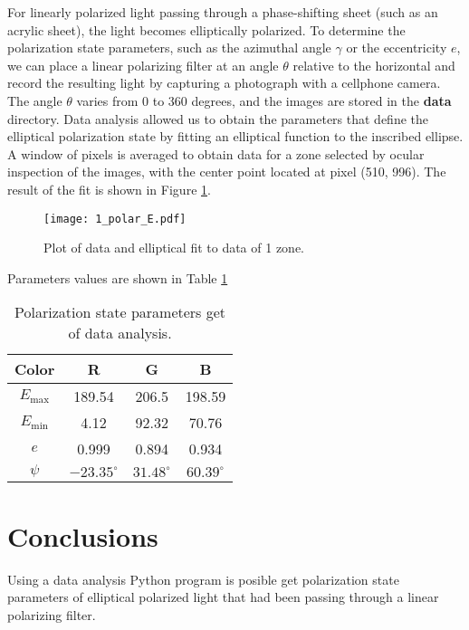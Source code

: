 \documentclass{article}
\begin{document}
For linearly polarized light passing through a phase-shifting sheet (such as an acrylic sheet), the light becomes elliptically polarized. To determine the polarization state parameters, such as the azimuthal angle $\gamma$ or the eccentricity $e$, we can place a linear polarizing filter at an angle $\theta$ relative to the horizontal and record the resulting light by capturing a photograph with a cellphone camera. The angle $\theta$ varies from 0 to 360 degrees, and the images are stored in the \textbf{data} directory. Data analysis allowed us to obtain the parameters that define the elliptical polarization state by fitting an elliptical function to the inscribed ellipse. A window of pixels is averaged to obtain data for a zone selected by ocular inspection of the images, with the center point located at pixel (510, 996). The result of the fit is shown in Figure \ref{1}.

\begin{figure}[!h]
  \centering
  \texttt{[image: 1\_polar\_E.pdf]}
  \caption{Plot of data and elliptical fit to data of 1 zone.}
  \label{1}
\end{figure}

Parameters values are shown in Table \ref{t1}

\begin{table}[h]
\centering
\begin{tabular}{|c|c|c|c|}
\hline
Color & R & G & B \\
\hline
$E_{\text{max}}$ & 189.54 & 206.5 & 198.59 \\
$E_{\text{min}}$ & 4.12 & 92.32 & 70.76 \\
$e$              & 0.999 & 0.894 & 0.934 \\
$\psi$           & $-23.35^\circ$ & $31.48^\circ$ & $60.39^\circ$ \\
\hline
\end{tabular}
\label{t1}
\caption{Polarization state parameters get of data analysis.}
\end{table}

\section{Conclusions}

Using a data analysis Python program is posible get polarization state parameters of elliptical polarized light that had been passing through a linear polarizing filter.
\end{document}
